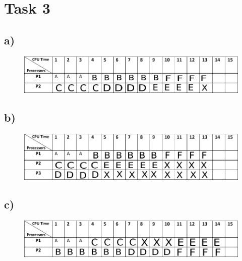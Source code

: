 \documentclass[10pt,a4paper]{article}
\begin{document}
\section*{Task 3}

\subsection*{a)}
\begin{figure}[h]
\includegraphics[width=\linewidth]{timing-diagram3a.pdf}
\end{figure}

\subsection*{b)}
\begin{figure}[h]
\includegraphics[width=\linewidth]{timing-diagram3b.pdf}
\end{figure}

\subsection*{c)}
\begin{figure}[h]
\includegraphics[width=\linewidth]{timing-diagram3c.pdf}
\end{figure}
\end{document}
